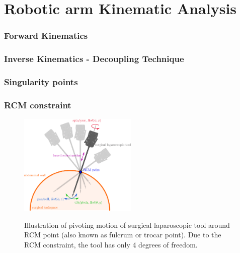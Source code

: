 \section{Robotic arm Kinematic Analysis}

\begin{frame}
\frametitle{Forward Kinematics}
\end{frame}

\begin{frame}
\frametitle{Inverse Kinematics - Decoupling Technique}
\end{frame}

\begin{frame}
\frametitle{Singularity points}
\end{frame}

\begin{frame}
\frametitle{RCM constraint}
\begin{center}
\begin{figure}[H]
\centering
\includegraphics[width=0.5\textwidth]{../images/rcm-surgical-tool.png}\\
\caption{Illustration of pivoting motion of surgical laparoscopic tool around RCM point (also known as fulcrum or trocar point). Due to the RCM constraint, the tool has only 4 degrees of freedom.}
\end{figure}
\end{center}
\end{frame}

